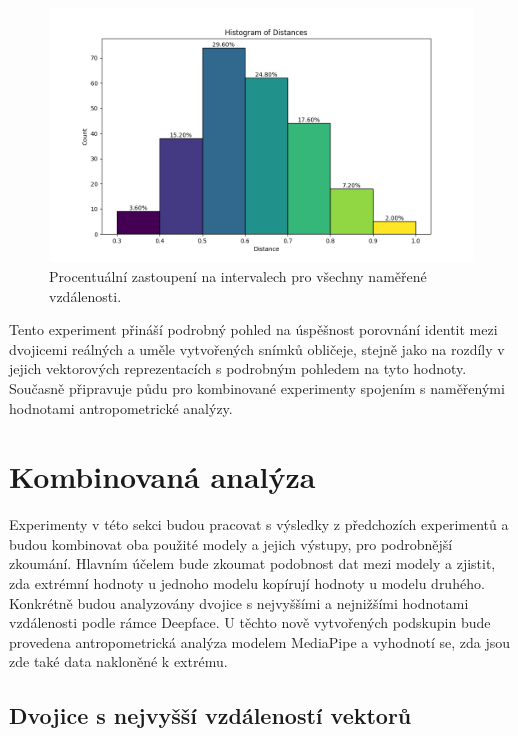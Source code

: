 \begin{figure}[H]
	\centering
	\includegraphics[width=1\textwidth]{obrazky-figures/deepface_distance_histogram.png}
	\caption{Procentuální zastoupení na intervalech pro všechny naměřené vzdálenosti.}
        \label{fig:plot-intervals}
\end{figure}

\noindent Tento experiment přináší podrobný pohled na úspěšnost porovnání identit mezi dvojicemi reálných a uměle vytvořených snímků obličeje, stejně jako na rozdíly v jejich vektorových reprezentacích s podrobným pohledem na tyto hodnoty. Současně připravuje půdu pro kombinované experimenty spojením s naměřenými hodnotami antropometrické analýzy.

\section{Kombinovaná analýza}
\label{combinates-analysis}

Experimenty v této sekci budou pracovat s výsledky z předchozích experimentů a budou kombinovat oba použité modely a jejich výstupy, pro podrobnější zkoumání. Hlavním účelem bude zkoumat podobnost dat mezi modely a zjistit, zda extrémní hodnoty u jednoho modelu kopírují hodnoty u modelu druhého. Konkrétně budou analyzovány dvojice s nejvyššími a nejnižšími hodnotami vzdálenosti podle rámce Deepface. U těchto nově vytvořených podskupin bude provedena antropometrická analýza modelem MediaPipe a vyhodnotí se, zda jsou zde také data nakloněné k extrému.

\subsection*{Dvojice s nejvyšší vzdáleností vektorů}

